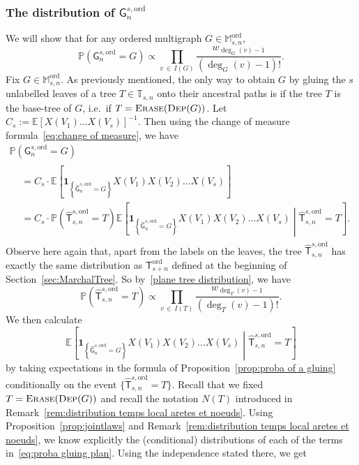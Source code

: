 \documentclass[AHL,Unicode,longabstracts,published]{cedram}
\newcommand{\Ec}[1]{\mathbb{E} \left[#1\right]}
\newcommand{\Pp}[1]{\mathbb{P} \left(#1\right)}
\newcommand{\Ecsq}[2]{\mathbb{E} \left[#1\mathrel{}\middle|\mathrel{}#2\right]}
\newcommand{\ind}[1]{\mathbf{1}_{\left\lbrace #1 \right\rbrace}}
\newcommand{\Prob}[1]{\ensuremath{\mathbb{P} \left(#1 \right)}}
\newcommand{\ord}{\mathrm{ord}}
\newcommand{\sG}{\mathsf{G}}
\newcommand{\sT}{\mathsf{T}}
\newcommand{\A}{\mathbb{T}}
\newcommand{\M}{\mathbb{M}}
\begin{document}
\subsubsection{The distribution of $\sG_{n}^{s,\ord}$}
We will show that for any ordered multigraph $G\in\M_{s,n}^{\ord}$,
\begin{equation}\label{eq:distribution ordered multigraphs}
\Pp{\sG_{n}^{s,\ord}=G}\propto\prod_{v\,\in\,I(G)}\frac{w_{\deg_G(v)-1}}{\left(\deg_G(v)-1\right)!}.
\end{equation}
Fix $G \in\M_{s,n}^{\ord}$. As previously mentioned, the only way to obtain $G$ by gluing the $s$ unlabelled leaves of a tree $T\in\A_{s,n}$ onto their ancestral paths is if the tree $T$ is the base-tree of $G$, i.e.\ if $T=\textsc{Erase}(\textsc{Dep}(G))$. Let $C_s:=\Ec{X(V_1)\dots X(V_s)}^{-1}$. Then using the change of measure formula~\eqref{eq:change of measure}, we have
\begin{multline}\label{eq:unbiasing}
\Pp{\sG_{n}^{s,\ord}=G}\\
\begin{aligned}
 &=C_s \cdot \Ec{\ind{\widehat{\sG}_{n}^{s,\ord}=G}X(V_1)X(V_2)\dots X(V_s)}\\
&=C_s \cdot \Pp{\widehat{\sT}_{s,n}^{s,\ord}=T}\Ecsq{\ind{\widehat{\sG}_{n}^{s,\ord}=G}X(V_1)X(V_2)\dots X(V_s)}{\widehat{\sT}_{s,n}^{s,\ord}=T}.
\end{aligned}
\end{multline}
Observe here again that, apart from the labels on the leaves, the tree $\widehat{\sT}_{s,n}^{s,\ord}$ has exactly the same distribution as $\sT^{\ord}_{s+n}$ defined at the beginning of Section~\ref{sec:MarchalTree}. So by~\eqref{plane tree distribution}, we have
\begin{equation}\label{eq:tree}
\Prob{\widehat{\sT}_{s,n}^{s,\ord}=T} \propto \prod_{v\,\in\,I(T)}\frac{w_{\deg_T(v)-1}}{(\deg_T(v)-1)!}.
\end{equation}
We then calculate
\[
\Ecsq{\ind{\widehat{\sG}_{n}^{s,\ord}=G}X(V_1)X(V_2)\dots X(V_s)}{\widehat{\sT}_{s,n}^{s,\ord}=T}
\]
by taking expectations in the formula of Proposition~\ref{prop:proba of a gluing} conditionally on the event $\{\widehat{\sT}_{s,n}^{s,\ord}=T\}$. Recall that we fixed $T=\textsc{Erase}(\textsc{Dep}(G))$ and recall the notation $N(T)$ introduced in Remark~\ref{rem:distribution temps local aretes et noeuds}. Using Proposition~\ref{prop:jointlaws} and Remark~\ref{rem:distribution temps local aretes et noeuds}, we know explicitly the (conditional) distributions of each of the terms in~\eqref{eq:proba gluing plan}. Using the independence stated there, we get
\end{document}
